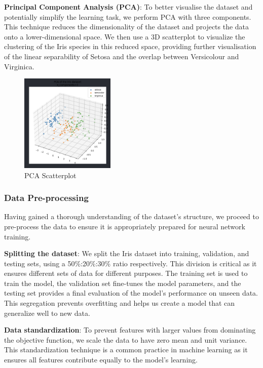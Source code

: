 \documentclass[conference]{inc/IEEEtran}
\begin{document}
\textbf{Principal Component Analysis (PCA)}: To better visualise the dataset and potentially simplify the learning task, we perform PCA with three components. This technique reduces the dimensionality of the dataset and projects the data onto a lower-dimensional space. We then use a 3D scatterplot to visualize the clustering of the Iris species in this reduced space, providing further visualisation of the linear separability of Setosa and the overlap between Versicolour and Virginica.

\begin{figure}
  \includegraphics[width=0.4\textwidth]{figures/pca.png}
  \caption{PCA Scatterplot}
  \label{fig:boat1}
\end{figure}

\subsubsection{Data Pre-processing}

Having gained a thorough understanding of the dataset's structure, we proceed to pre-process the data to ensure it is appropriately prepared for neural network training.

\textbf{Splitting the dataset}: We split the Iris dataset into training, validation, and testing sets, using a 50\%:20\%:30\% ratio respectively. This division is critical as it ensures different sets of data for different purposes. The training set is used to train the model, the validation set fine-tunes the model parameters, and the testing set provides a final evaluation of the model's performance on unseen data. This segregation prevents overfitting and helps us create a model that can generalize well to new data.

\textbf{Data standardization}: To prevent features with larger values from dominating the objective function, we scale the data to have zero mean and unit variance. This standardization technique is a common practice in machine learning as it ensures all features contribute equally to the model's learning.
\end{document}

